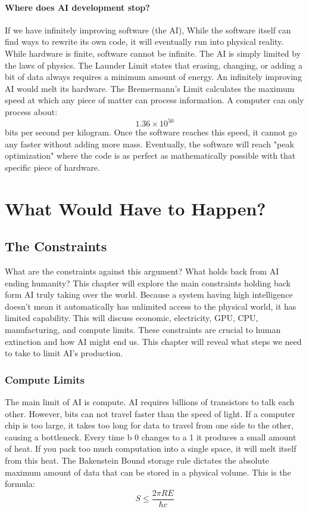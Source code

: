 \documentclass{report}
\begin{document}
	\subsection{Where does AI development stop?}
	If we have infinitely improving software (the AI), While the software itself can find ways to rewrite its own code, it will eventually run into physical reality. While hardware is finite, software cannot be infinite. The AI is simply limited by the laws of physics. The Launder Limit states that erasing, changing, or adding a bit of data always requires a minimum amount of energy. An infinitely improving AI would melt its hardware. The Bremermann's Limit calculates the maximum speed at which any piece of matter can process information. A computer can only process about: $$1.36 \times 10^{50}$$ bits per second per kilogram. Once the software reaches this speed, it cannot go any faster without adding more mass. Eventually, the software will reach "peak optimization" where the code is as perfect as mathematically possible with that specific piece of hardware.
	
	\vspace{7cm}
	
	\noindent{}
	
	\part{What Would Have to Happen?}
	
	\chapter{The Constraints}
	
	What are the constraints against this argument? What holds back from AI ending humanity? This chapter will explore the main constraints holding back form AI truly taking over the world. Because a system having high intelligence doesn't mean it automatically has unlimited access to the physical world, it has limited capability. This will discuss economic, electricity, GPU, CPU, manufacturing, and compute limits. These constraints are crucial to human extinction and how AI might end us. This chapter will reveal what steps we need to take to limit AI's production.
	
	\section{Compute Limits}
	The main limit of AI is compute. AI requires billions of transistors to talk each other. However, bits can not travel faster than the speed of light. If a computer chip is too large, it takes too long for data to travel from one side to the other, causing a bottleneck. Every time b 0 changes to a 1 it produces a small amount of heat. If you pack too much computation into a single space, it will melt itself from this heat. The Bakenstein Bound storage rule dictates the absolute maximum amount of data that can be stored in a physical volume. This is the formula:
	\[
	S \leq \frac{2\pi RE}{\hbar c}
	\]
	
\end{document}
